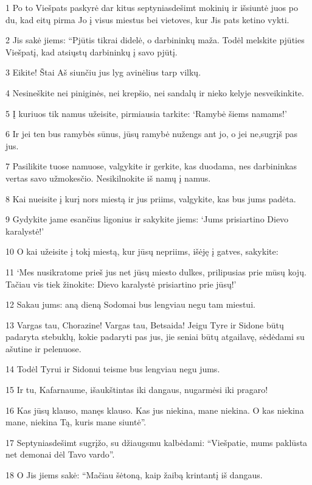 \par 1 Po to Viešpats paskyrė dar kitus septyniasdešimt mokinių ir išsiuntė juos po du, kad eitų pirma Jo į visus miestus bei vietoves, kur Jis pats ketino vykti. 
\par 2 Jis sakė jiems: “Pjūtis tikrai didelė, o darbininkų maža. Todėl melskite pjūties Viešpatį, kad atsiųstų darbininkų į savo pjūtį. 
\par 3 Eikite! Štai Aš siunčiu jus lyg avinėlius tarp vilkų. 
\par 4 Nesineškite nei piniginės, nei krepšio, nei sandalų ir nieko kelyje nesveikinkite. 
\par 5 Į kuriuos tik namus užeisite, pirmiausia tarkite: ‘Ramybė šiems namams!’ 
\par 6 Ir jei ten bus ramybės sūnus, jūsų ramybė nužengs ant jo, o jei ne,­sugrįš pas jus. 
\par 7 Pasilikite tuose namuose, valgykite ir gerkite, kas duodama, nes darbininkas vertas savo užmokesčio. Nesikilnokite iš namų į namus. 
\par 8 Kai nueisite į kurį nors miestą ir jus priims, valgykite, kas bus jums padėta. 
\par 9 Gydykite jame esančius ligonius ir sakykite jiems: ‘Jums prisiartino Dievo karalystė!’ 
\par 10 O kai užeisite į tokį miestą, kur jūsų nepriims, išėję į gatves, sakykite: 
\par 11 ‘Mes nusikratome prieš jus net jūsų miesto dulkes, prilipusias prie mūsų kojų. Tačiau vis tiek žinokite: Dievo karalystė prisiartino prie jūsų!’ 
\par 12 Sakau jums: aną dieną Sodomai bus lengviau negu tam miestui. 
\par 13 Vargas tau, Chorazine! Vargas tau, Betsaida! Jeigu Tyre ir Sidone būtų padaryta stebuklų, kokie padaryti pas jus, jie seniai būtų atgailavę, sėdėdami su ašutine ir pelenuose. 
\par 14 Todėl Tyrui ir Sidonui teisme bus lengviau negu jums. 
\par 15 Ir tu, Kafarnaume, išaukštintas iki dangaus, nugarmėsi iki pragaro! 
\par 16 Kas jūsų klauso, manęs klauso. Kas jus niekina, mane niekina. O kas niekina mane, niekina Tą, kuris mane siuntė”. 
\par 17 Septyniasdešimt sugrįžo, su džiaugsmu kalbėdami: “Viešpatie, mums paklūsta net demonai dėl Tavo vardo”. 
\par 18 O Jis jiems sakė: “Mačiau šėtoną, kaip žaibą krintantį iš dangaus. 
